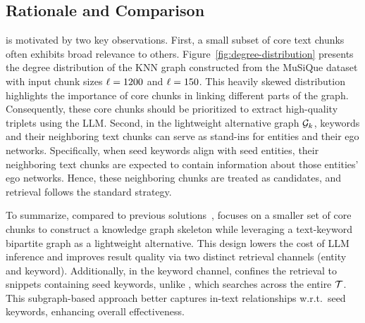 \subsection{Rationale and Comparison}\label{sec:ket-rationale}

\sketrag is motivated by two key observations. First, a small subset of core text chunks often exhibits broad relevance to others. Figure~\ref{fig:degree-distribution} presents the degree distribution of the KNN graph constructed from the MuSiQue dataset with input chunk sizes $\ell = 1200$ and $\ell = 150$. This heavily skewed distribution highlights the importance of core chunks in linking different parts of the graph. Consequently, these core chunks should be prioritized to extract high-quality triplets using the LLM.
Second, in the lightweight alternative graph $\mathcal{G}_k$, keywords and their neighboring text chunks can serve as stand-ins for entities and their ego networks. Specifically, when seed keywords align with seed entities, their neighboring text chunks are expected to contain information about those entities' ego networks. Hence, these neighboring chunks are treated as candidates, and retrieval follows the standard \textrag strategy.

To summarize, compared to previous \kgrag solutions~\cite{li2024dalk,delile2024graph,edge2024local,gutierrez2024hipporag}, \sketrag focuses on a smaller set of core chunks to construct a knowledge graph skeleton while leveraging a text-keyword bipartite graph as a lightweight alternative. This design lowers the cost of LLM inference and improves result quality via two distinct retrieval channels (entity and keyword). Additionally, in the keyword channel, \sketrag confines the retrieval to snippets containing seed keywords, unlike \textrag, which searches across the entire $\mathcal{T}$. This subgraph-based approach better captures in-text relationships w.r.t.\ seed keywords, enhancing overall effectiveness.

